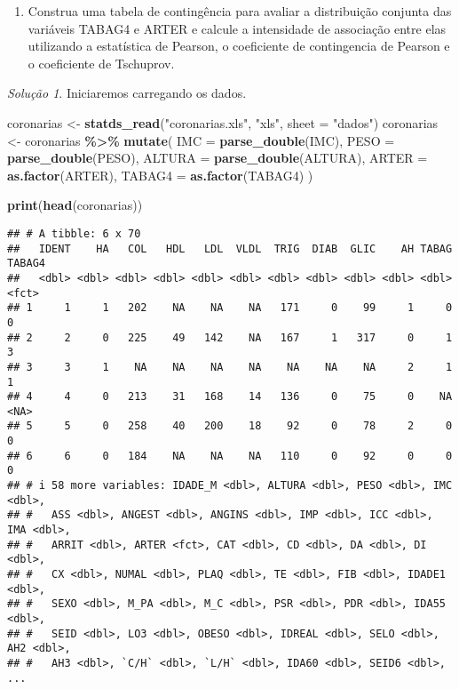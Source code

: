 \documentclass[
]{latex/krantz}
\newenvironment{Shaded}{\begin{snugshade}}{\end{snugshade}}
\newcommand{\AttributeTok}[1]{\textcolor[rgb]{0.13,0.29,0.53}{#1}}
\newcommand{\FunctionTok}[1]{\textcolor[rgb]{0.13,0.29,0.53}{\textbf{#1}}}
\newcommand{\NormalTok}[1]{#1}
\newcommand{\OtherTok}[1]{\textcolor[rgb]{0.56,0.35,0.01}{#1}}
\newcommand{\SpecialCharTok}[1]{\textcolor[rgb]{0.81,0.36,0.00}{\textbf{#1}}}
\newcommand{\StringTok}[1]{\textcolor[rgb]{0.31,0.60,0.02}{#1}}
\providecommand{\tightlist}{%
  \setlength{\itemsep}{0pt}\setlength{\parskip}{0pt}}
\theoremstyle{definition}
\theoremstyle{definition}
\theoremstyle{definition}
\theoremstyle{definition}
\theoremstyle{remark}
\newtheorem*{solution}{Solução}
\begin{document}
\begin{enumerate}
\def\labelenumi{\alph{enumi})}
\setcounter{enumi}{2}
\tightlist
\item
  Construa uma tabela de contingência para avaliar a distribuição conjunta das variáveis TABAG4 e ARTER e calcule a intensidade de associação entre elas utilizando a estatística de Pearson, o coeficiente de contingencia de Pearson e o coeficiente de Tschuprov.
\end{enumerate}

\begin{solution}
Iniciaremos carregando os dados.

\begin{Shaded}
\begin{Highlighting}[]
\NormalTok{coronarias }\OtherTok{\textless{}{-}} \FunctionTok{statds\_read}\NormalTok{(}\StringTok{"coronarias.xls"}\NormalTok{, }\StringTok{"xls"}\NormalTok{, }\AttributeTok{sheet =} \StringTok{"dados"}\NormalTok{)}
\NormalTok{coronarias }\OtherTok{\textless{}{-}}\NormalTok{ coronarias }\SpecialCharTok{\%\textgreater{}\%} 
                \FunctionTok{mutate}\NormalTok{(}
                  \AttributeTok{IMC =} \FunctionTok{parse\_double}\NormalTok{(IMC),}
                  \AttributeTok{PESO =} \FunctionTok{parse\_double}\NormalTok{(PESO),}
                  \AttributeTok{ALTURA =} \FunctionTok{parse\_double}\NormalTok{(ALTURA),}
                  \AttributeTok{ARTER =} \FunctionTok{as.factor}\NormalTok{(ARTER),}
                  \AttributeTok{TABAG4 =} \FunctionTok{as.factor}\NormalTok{(TABAG4)}
\NormalTok{                )}

\FunctionTok{print}\NormalTok{(}\FunctionTok{head}\NormalTok{(coronarias))}
\end{Highlighting}
\end{Shaded}

\begin{verbatim}
## # A tibble: 6 x 70
##   IDENT    HA   COL   HDL   LDL  VLDL  TRIG  DIAB  GLIC    AH TABAG TABAG4
##   <dbl> <dbl> <dbl> <dbl> <dbl> <dbl> <dbl> <dbl> <dbl> <dbl> <dbl> <fct> 
## 1     1     1   202    NA    NA    NA   171     0    99     1     0 0     
## 2     2     0   225    49   142    NA   167     1   317     0     1 3     
## 3     3     1    NA    NA    NA    NA    NA    NA    NA     2     1 1     
## 4     4     0   213    31   168    14   136     0    75     0    NA <NA>  
## 5     5     0   258    40   200    18    92     0    78     2     0 0     
## 6     6     0   184    NA    NA    NA   110     0    92     0     0 0     
## # i 58 more variables: IDADE_M <dbl>, ALTURA <dbl>, PESO <dbl>, IMC <dbl>,
## #   ASS <dbl>, ANGEST <dbl>, ANGINS <dbl>, IMP <dbl>, ICC <dbl>, IMA <dbl>,
## #   ARRIT <dbl>, ARTER <fct>, CAT <dbl>, CD <dbl>, DA <dbl>, DI <dbl>,
## #   CX <dbl>, NUMAL <dbl>, PLAQ <dbl>, TE <dbl>, FIB <dbl>, IDADE1 <dbl>,
## #   SEXO <dbl>, M_PA <dbl>, M_C <dbl>, PSR <dbl>, PDR <dbl>, IDA55 <dbl>,
## #   SEID <dbl>, LO3 <dbl>, OBESO <dbl>, IDREAL <dbl>, SELO <dbl>, AH2 <dbl>,
## #   AH3 <dbl>, `C/H` <dbl>, `L/H` <dbl>, IDA60 <dbl>, SEID6 <dbl>, ...
\end{verbatim}


\end{solution}
\end{document}
